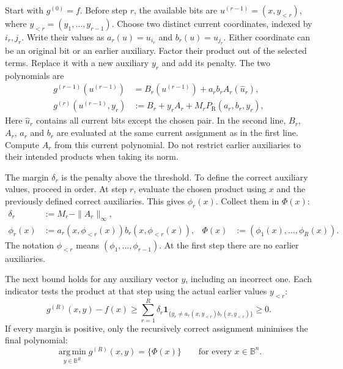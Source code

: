 \documentclass[a4paper,onecolumn,11pt,unpublished]{quantumarticle}
\theoremstyle{remark}
\begin{document}
Start with $g^{(0)}=f$. Before step $r$, the available bits are
$u^{(r-1)}=(x,y_{<r})$, where $y_{<r}=(y_1,\ldots,y_{r-1})$.
Choose two distinct current coordinates, indexed by $i_r,j_r$.
Write their values as $a_r(u)=u_{i_r}$ and $b_r(u)=u_{j_r}$.
Either coordinate can be an original bit or an earlier auxiliary.
Factor their product out of the selected terms. Replace it with a
new auxiliary $y_r$ and add its penalty. The two polynomials are
\begin{equation}
  \begin{aligned}
    g^{(r-1)}(u^{(r-1)})
    &=B_r(u^{(r-1)})+a_rb_rA_r(\widehat u_r),\\
    g^{(r)}(u^{(r-1)},y_r)
    &:=B_r+y_rA_r+M_rP_{\mathrm R}(a_r,b_r,y_r),
  \end{aligned}
  \label{eq:sequential-substitution}
\end{equation}
Here $\widehat u_r$ contains all current bits except the chosen pair.
In the second line, $B_r$, $A_r$, $a_r$ and $b_r$ are evaluated at the
same current assignment as in the first line.
Compute $A_r$ from this current polynomial. Do not restrict earlier
auxiliaries to their intended products when taking its norm.

The margin $\delta_r$ is the penalty above the threshold.
To define the correct auxiliary values, proceed in order.
At step $r$, evaluate the chosen product using $x$ and the previously
defined correct auxiliaries. This gives $\phi_r(x)$. Collect them in
$\Phi(x)$:
\begin{equation}
  \begin{aligned}
    \delta_r&:=M_r-\|A_r\|_\infty,\\
    \phi_r(x)&:=a_r(x,\phi_{<r}(x))b_r(x,\phi_{<r}(x)),
    &\Phi(x)&:=(\phi_1(x),\ldots,\phi_R(x)).
  \end{aligned}
  \label{eq:sequential-margin-and-lift}
\end{equation}
The notation $\phi_{<r}$ means $(\phi_1,\ldots,\phi_{r-1})$.
At the first step there are no earlier auxiliaries.

The next bound holds for any auxiliary vector $y$, including an
incorrect one. Each indicator tests the product at that step using
the actual earlier values $y_{<r}$:
\begin{equation}
  g^{(R)}(x,y)-f(x)
  \geq
  \sum_{r=1}^R\delta_r
  \mathbf 1_{\{y_r\neq
  a_r(x,y_{<r})b_r(x,y_{<r})\}}\geq0.
  \label{eq:compositional-gap}
\end{equation}
If every margin is positive, only the recursively correct assignment
minimises the final polynomial:
\begin{equation}
  \operatorname*{arg\,min}_{y\in\mathbb B^R}g^{(R)}(x,y)
  =\{\Phi(x)\}
  \qquad\text{for every }x\in\mathbb B^n.
  \label{eq:strict-fibre-uniqueness}
\end{equation}
\end{document}
